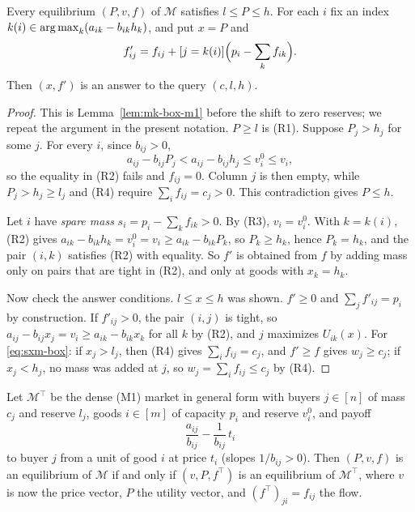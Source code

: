 \begin{lemma}[Singles]\label{lem:sxm-reserve}
Every equilibrium $(P,v,f)$ of $\mathcal M$ satisfies $l\le P\le h$. For each $i$ fix an index
$k(i)\in\operatorname*{arg\,max}_k(a_{ik}-b_{ik}h_k)$, and put $x=P$ and
\[
f'_{ij}=f_{ij}+[j=k(i)]\Bigl(p_i-\sum_{k}f_{ik}\Bigr).
\]
Then $(x,f')$ is an answer to the query $(c,l,h)$.
\end{lemma}

\begin{proof}
This is Lemma~\ref{lem:mk-box-m1} before the shift to zero reserves; we repeat the argument in the
present notation. $P\ge l$ is (R1). Suppose $P_j>h_j$ for some $j$. For every $i$, since $b_{ij}>0$,
\[
a_{ij}-b_{ij}P_j<a_{ij}-b_{ij}h_j\le v_i^0\le v_i,
\]
so the equality in (R2) fails and $f_{ij}=0$. Column $j$ is then empty, while $P_j>h_j\ge l_j$ and
(R4) require $\sum_if_{ij}=c_j>0$. This contradiction gives $P\le h$.

Let $i$ have \emph{spare mass} $s_i=p_i-\sum_kf_{ik}>0$. By (R3), $v_i=v_i^0$. With $k=k(i)$, (R2)
gives $a_{ik}-b_{ik}h_k=v_i^0=v_i\ge a_{ik}-b_{ik}P_k$, so $P_k\ge h_k$, hence $P_k=h_k$, and the pair
$(i,k)$ satisfies (R2) with equality. So $f'$ is obtained from $f$ by adding mass only on pairs that are
tight in (R2), and only at goods with $x_k=h_k$.

Now check the answer conditions. $l\le x\le h$ was shown. $f'\ge0$ and $\sum_jf'_{ij}=p_i$ by
construction. If $f'_{ij}>0$, the pair $(i,j)$ is tight, so $a_{ij}-b_{ij}x_j=v_i\ge a_{ik}-b_{ik}x_k$
for all $k$ by (R2), and $j$ maximizes $U_{ik}(x)$. For \eqref{eq:sxm-box}: if $x_j>l_j$, then (R4) gives
$\sum_if_{ij}=c_j$, and $f'\ge f$ gives $w_j\ge c_j$; if $x_j<h_j$, no mass was added at $j$, so
$w_j=\sum_if_{ij}\le c_j$ by (R4).
\end{proof}

\begin{lemma}[Transposition]\label{lem:sxm-transpose}
Let $\mathcal M^\top$ be the dense (M1) market in general form with buyers $j\in[n]$ of mass $c_j$ and
reserve $l_j$, goods $i\in[m]$ of capacity $p_i$ and reserve $v_i^0$, and payoff
\[
\frac{a_{ij}}{b_{ij}}-\frac1{b_{ij}}\,t_i
\]
to buyer $j$ from a unit of good $i$ at price $t_i$ (slopes $1/b_{ij}>0$). Then $(P,v,f)$ is an
equilibrium of $\mathcal M$ if and only if $(v,P,f^\top)$ is an equilibrium of $\mathcal M^\top$, where $v$
is now the price vector, $P$ the utility vector, and $(f^\top)_{ji}=f_{ij}$ the flow.
\end{lemma}

